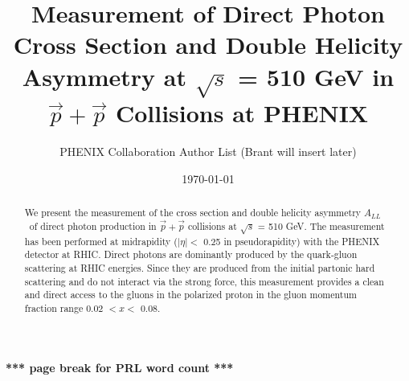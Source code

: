 \documentclass[twocolumn,letterpaper,aps,prl,longbibliography,superscriptaddress,floatfix]{revtex4-2}
\newcommand{\ALL}{\ensuremath{A_{LL}}}
\begin{document}


\title{Measurement of Direct Photon Cross Section and Double Helicity Asymmetry at $\sqrt{s}$ = 510 GeV in $\vec{p}+\vec{p}$ Collisions at PHENIX}

\author{PHENIX Collaboration Author List (Brant will insert later)}

\date{\today}

\begin{abstract}
We present the measurement of the cross section and double helicity asymmetry \ALL\ of direct photon production in $\vec{p}+\vec{p}$ collisions at $\sqrt{s}$ = 510 GeV. The measurement has been performed at midrapidity ($|\eta| <$ 0.25 in pseudorapidity) with the PHENIX detector at RHIC. Direct photons are dominantly produced by the quark-gluon scattering at RHIC energies. Since they are produced from the initial partonic hard scattering and do not interact via the strong force, this measurement provides a clean and direct access to the gluons in the polarized proton in the gluon momentum fraction range 0.02 $< x <$ 0.08.
\end{abstract}

	
\maketitle

\textbf{*** page break for PRL word count ***}  \clearpage
\end{document}
